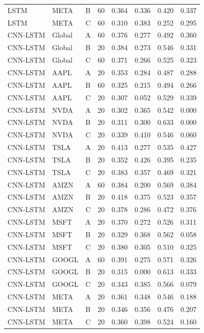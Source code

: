 \documentclass[10pt]{article}
\begin{document}
{\begin{longtable}{@{}l l c c c c c c@{}}
LSTM & META & B & 60 & 0.364 & 0.336 & 0.420 & 0.337 \\
LSTM & META & C & 60 & 0.310 & 0.383 & 0.252 & 0.295 \\
\midrule
CNN-LSTM & Global & A & 60 & 0.376 & 0.277 & 0.492 & 0.360 \\
CNN-LSTM & Global & B & 20 & 0.384 & 0.273 & 0.546 & 0.331 \\
CNN-LSTM & Global & C & 60 & 0.371 & 0.266 & 0.525 & 0.323 \\
CNN-LSTM & AAPL & A & 20 & 0.353 & 0.284 & 0.487 & 0.288 \\
CNN-LSTM & AAPL & B & 60 & 0.325 & 0.215 & 0.494 & 0.266 \\
CNN-LSTM & AAPL & C & 20 & 0.307 & 0.052 & 0.529 & 0.339 \\
CNN-LSTM & NVDA & A & 20 & 0.302 & 0.365 & 0.542 & 0.000 \\
CNN-LSTM & NVDA & B & 20 & 0.311 & 0.300 & 0.633 & 0.000 \\
CNN-LSTM & NVDA & C & 20 & 0.339 & 0.410 & 0.546 & 0.060 \\
CNN-LSTM & TSLA & A & 20 & 0.413 & 0.277 & 0.535 & 0.427 \\
CNN-LSTM & TSLA & B & 20 & 0.352 & 0.426 & 0.395 & 0.235 \\
CNN-LSTM & TSLA & C & 20 & 0.383 & 0.357 & 0.469 & 0.321 \\
CNN-LSTM & AMZN & A & 60 & 0.384 & 0.200 & 0.569 & 0.384 \\
CNN-LSTM & AMZN & B & 20 & 0.418 & 0.375 & 0.523 & 0.357 \\
CNN-LSTM & AMZN & C & 20 & 0.378 & 0.286 & 0.472 & 0.376 \\
CNN-LSTM & MSFT & A & 20 & 0.370 & 0.272 & 0.526 & 0.311 \\
CNN-LSTM & MSFT & B & 20 & 0.329 & 0.368 & 0.562 & 0.058 \\
CNN-LSTM & MSFT & C & 20 & 0.380 & 0.305 & 0.510 & 0.325 \\
CNN-LSTM & GOOGL & A & 60 & 0.391 & 0.275 & 0.571 & 0.326 \\
CNN-LSTM & GOOGL & B & 20 & 0.315 & 0.000 & 0.613 & 0.333 \\
CNN-LSTM & GOOGL & C & 20 & 0.343 & 0.385 & 0.566 & 0.079 \\
CNN-LSTM & META & A & 20 & 0.361 & 0.348 & 0.546 & 0.188 \\
CNN-LSTM & META & B & 20 & 0.346 & 0.356 & 0.476 & 0.207 \\
CNN-LSTM & META & C & 20 & 0.360 & 0.398 & 0.524 & 0.160 \\

\end{longtable}}
\end{document}

